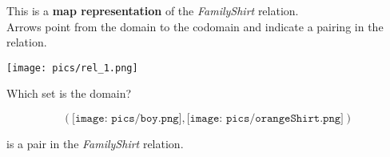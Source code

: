 \documentclass{ximera}
\author{Lee Wayand}
\begin{document}
\begin{exercise}

This is a \textbf{map representation} of the \textit{FamilyShirt} relation. \\


Arrows point from the domain to the codomain and indicate a pairing in the relation.


\begin{image}
\texttt{[image: pics/rel\_1.png]}
\end{image}


Which set is the domain?



\begin{multipleChoice}
\end{multipleChoice}



\begin{question}

\[
\left( \texttt{[image: pics/boy.png]}, \texttt{[image: pics/orangeShirt.png]} \right)
\]


is a pair in the \textit{FamilyShirt} relation.

\begin{multipleChoice}
\end{multipleChoice}
\end{question}



\end{exercise}
\end{document}
